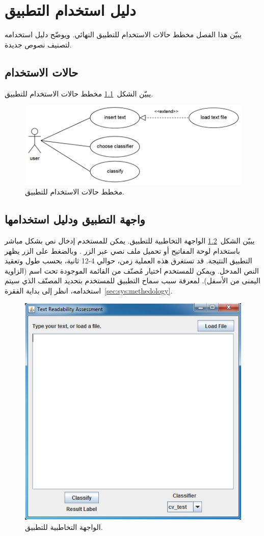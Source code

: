 

\chapter{دليل استخدام التطبيق}
يبيّن هذا الفصل مخطط حالات الاستخدام للتطبيق النهائي.
ويوضّح دليل استخدامه لتصنيف نصوص جديدة.

\section{حالات الاستخدام}
يبيّن الشكل~\ref{fig:man:use-case} مخطط حالات الاستخدام للتطبيق.

\begin{figure}[htb]
	\centering
	\includegraphics[width=0.8\linewidth]{images/use-case-diagram.png}
	\caption{%
		مخطط حالات الاستخدام للتطبيق.
	}
	\label{fig:man:use-case}
\end{figure}


\section{واجهة التطبيق ودليل استخدامها}

يبيّن الشكل~\ref{fig:man:gui} الواجهة التخاطبية للتطبيق.
يمكن للمستخدم إدخال نص بشكل مباشر باستخدام لوحة المفاتيح أو تحميل ملف نصي عبر الزر .
وبالضغط على الزر  يظهر التطبيق النتيجة.
قد تستغرق هذه العملية زمن، حوالي 4-12 ثانية، بحسب طول وتعقيد النص المدخل.
ويمكن للمستخدم اختيار مُصنّف من القائمة الموجودة تحت اسم  (الزاوية اليمنى من الأسفل).
لمعرفة سبب سماح التطبيق للمستخدم بتحديد المصنّف الذي سيتم استخدامه،
انظر إلى بداية الفقرة~\ref{sec:sys:methedology}.


\begin{figure}[htb]
	\centering
	\includegraphics[width=0.7\linewidth]{images/app-gui.png}
	\caption{%
		الواجهة التخاطبية للتطبيق.
	}
	\label{fig:man:gui}
\end{figure}

